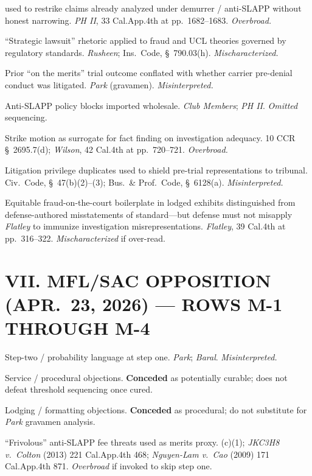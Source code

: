 \begin{description}
\tightlist
\item[S-1.]  used to restrike claims already analyzed under demurrer / anti-SLAPP without honest narrowing. \textit{PH II}, 33 Cal.App.4th at pp.\ 1682--1683. \textit{Overbroad.}
\item[S-2.] ``Strategic lawsuit'' rhetoric applied to fraud and UCL theories governed by regulatory standards. \textit{Rusheen}; Ins.\ Code, \S~790.03(h). \textit{Mischaracterized.}
\item[S-3.] Prior ``on the merits'' trial outcome conflated with whether carrier pre-denial conduct was litigated. \textit{Park} (gravamen). \textit{Misinterpreted.}
\item[S-4.] Anti-SLAPP policy blocks imported wholesale. \textit{Club Members}; \textit{PH II}. \textit{Omitted} sequencing.
\item[S-5.] Strike motion as surrogate for fact finding on investigation adequacy. 10 CCR \S~2695.7(d); \textit{Wilson}, 42 Cal.4th at pp.\ 720--721. \textit{Overbroad.}
\item[S-6.] Litigation privilege duplicates used to shield pre-trial representations to tribunal. Civ.\ Code, \S~47(b)(2)--(3); Bus.\ \& Prof.\ Code, \S~6128(a). \textit{Misinterpreted.}
\item[S-7.] Equitable fraud-on-the-court boilerplate in lodged exhibits distinguished from defense-authored misstatements of standard---but defense must not misapply \textit{Flatley} to immunize investigation misrepresentations. \textit{Flatley}, 39 Cal.4th at pp.\ 316--322. \textit{Mischaracterized} if over-read.
\end{description}

\section*{VII. MFL/SAC OPPOSITION (APR.\ 23, 2026) --- ROWS M-1 THROUGH M-4}

\begin{description}
\tightlist
\item[M-1.] Step-two / probability language at step one. \textit{Park}; \textit{Baral}. \textit{Misinterpreted.}
\item[M-2.] Service / procedural objections. \textbf{Conceded} as potentially curable; does not defeat threshold sequencing once cured.
\item[M-3.] Lodging / formatting objections. \textbf{Conceded} as procedural; do not substitute for \textit{Park} gravamen analysis.
\item[M-4.] ``Frivolous'' anti-SLAPP fee threats used as merits proxy. (c)(1); \textit{JKC3H8 v.\ Colton} (2013) 221 Cal.App.4th 468; \textit{Nguyen-Lam v.\ Cao} (2009) 171 Cal.App.4th 871. \textit{Overbroad} if invoked to skip step one.
\end{description}

